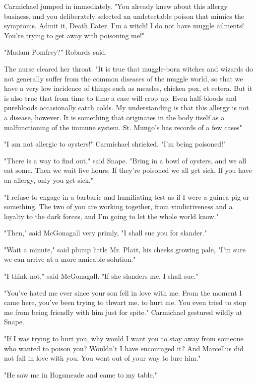 Carmichael jumped in immediately. "You already knew about this allergy business, and you deliberately selected an undetectable poison that mimics the symptoms. Admit it, Death Eater. I'm a witch! I do not have muggle ailments! You're trying to get away with poisoning me!"

"Madam Pomfrey?" Robards said.

The nurse cleared her throat. "It is true that muggle-born witches and wizards do not generally suffer from the common diseases of the muggle world, so that we have a very low incidence of things such as measles, chicken pox, et cetera. But it is also true that from time to time a case will crop up. Even half-bloods and purebloods occasionally catch colds. My understanding is that this allergy is not a disease, however. It is something that originates in the body itself as a malfunctioning of the immune system. St. Mungo's has records of a few cases{\el}"

"I am not allergic to oysters!" Carmichael shrieked. "I'm being poisoned!"

"There is a way to find out," said Snape. "Bring in a bowl of oysters, and we all eat some. Then we wait five hours. If they're poisoned we all get sick. If you have an allergy, only you get sick."

"I refuse to engage in a barbaric and humiliating test as if I were a guinea pig or something. The two of you are working together, from vindictiveness and a loyalty to the dark forces, and I'm going to let the whole world know."

"Then," said McGonagall very primly, "I shall sue you for slander."

"Wait a minute," said plump little Mr. Platt, his cheeks growing pale, "I'm sure we can arrive at a more amicable solution."

"I think not," said McGonagall. "If she slanders me, I shall sue."

"You've hated me ever since your son fell in love with me. From the moment I came here, you've been trying to thwart me, to hurt me. You even tried to stop me from being friendly with him just for spite." Carmichael gestured wildly at Snape.

"If I was trying to hurt you, why would I want you to stay away from someone who wanted to poison you? Wouldn't I have encouraged it? And Marcellus did not fall in love with you. You went out of your way to lure him."

"He saw me in Hogsmeade and came to my table."

